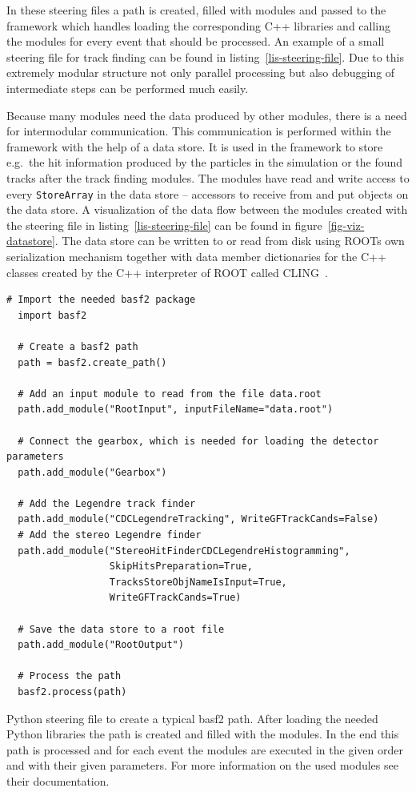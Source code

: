 In these steering files a path is created, filled with modules and passed to the framework which handles loading the corresponding C++ libraries and calling the modules for every event that should be processed. An example of a small steering file for track finding can be found in listing~\ref{lis-steering-file}. Due to this extremely modular structure not only parallel processing but also debugging of intermediate steps can be performed much easily.

Because many modules need the data produced by other modules, there is a need for intermodular communication. This communication is performed within the framework with the help of a data store. It is used in the framework to store e.g.\ the hit information produced by the particles in the simulation or the found tracks after the track finding modules. The modules have read and write access to every \texttt{StoreArray} in the data store -- accessors to receive from and put objects on the data store. A visualization of the data flow between the modules created with the steering file in listing~\ref{lis-steering-file} can be found in figure~\ref{fig-viz-datastore}. The data store can be written to or read from disk using ROOTs own serialization mechanism together with data member dictionaries for the C++ classes created by the C++ interpreter of ROOT called CLING~\cite{cling}.

\begin{listing}
 \begin{lstlisting}[style=customP]
  # Import the needed basf2 package
  import basf2

  # Create a basf2 path
  path = basf2.create_path()

  # Add an input module to read from the file data.root
  path.add_module("RootInput", inputFileName="data.root")
  
  # Connect the gearbox, which is needed for loading the detector parameters
  path.add_module("Gearbox")

  # Add the Legendre track finder
  path.add_module("CDCLegendreTracking", WriteGFTrackCands=False)
  # Add the stereo Legendre finder
  path.add_module("StereoHitFinderCDCLegendreHistogramming",
                  SkipHitsPreparation=True,
                  TracksStoreObjNameIsInput=True,
                  WriteGFTrackCands=True)
  
  # Save the data store to a root file
  path.add_module("RootOutput")

  # Process the path
  basf2.process(path)

 \end{lstlisting}
 \caption[Python steering file to create a typical basf2 path.]{Python steering file to create a typical basf2 path. After loading the needed Python libraries the path is created and filled with the modules. In the end this path is processed and for each event the modules are executed in the given order and with their given parameters. For more information on the used modules see their documentation.}
 \label{lis-steering-file}
\end{listing}


